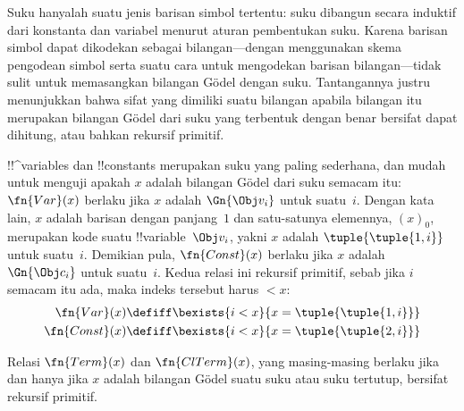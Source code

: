 \documentclass[../../../include/open-logic-section]{subfiles}
\begin{document}

\begin{explain}
Suku hanyalah suatu jenis barisan simbol tertentu: suku dibangun secara
induktif dari konstanta dan variabel menurut aturan pembentukan suku. Karena
barisan simbol dapat dikodekan sebagai bilangan---dengan menggunakan skema
pengodean simbol serta suatu cara untuk mengodekan barisan bilangan---tidak
sulit untuk memasangkan bilangan G\"odel dengan suku. Tantangannya justru
menunjukkan bahwa sifat yang dimiliki suatu bilangan apabila bilangan itu
merupakan bilangan G\"odel dari suku yang terbentuk dengan benar bersifat dapat
dihitung, atau bahkan rekursif primitif.
\end{explain}

!!^{variable}s dan !!{constant}s merupakan suku yang paling sederhana, dan
mudah untuk menguji apakah $x$ adalah bilangan G\"odel dari suku semacam itu:
$\fn{Var}(x)$ berlaku jika $x$ adalah $\Gn{\Obj v_i}$ untuk suatu~$i$. Dengan
kata lain, $x$ adalah barisan dengan panjang~$1$ dan satu-satunya elemennya,
$(x)_0$, merupakan kode suatu !!{variable}~$\Obj v_i$, yakni $x$ adalah
$\tuple{\tuple{1, i}}$ untuk suatu~$i$. Demikian pula, $\fn{Const}(x)$ berlaku
jika $x$ adalah $\Gn{\Obj c_i}$ untuk suatu~$i$. Kedua relasi ini rekursif
primitif, sebab jika $i$ semacam itu ada, maka indeks tersebut harus $< x$:
\begin{align*}
  \fn{Var}(x) & \defiff \bexists{i<x}{x = \tuple{\tuple{1, i}}}\\
  \fn{Const}(x) & \defiff \bexists{i<x}{x = \tuple{\tuple{2, i}}}
\end{align*}

\begin{prop}
Relasi $\fn{Term}(x)$ dan $\fn{ClTerm}(x)$, yang masing-masing berlaku jika dan
hanya jika $x$ adalah bilangan G\"odel suatu suku atau suku tertutup, bersifat
rekursif primitif.
\end{prop}
\end{document}
